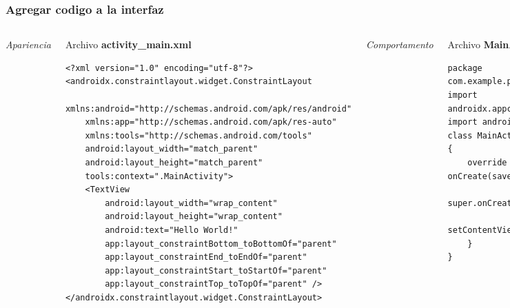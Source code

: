 \begin{frame}
\begin{columns}
\begin{center}
\end{center}
\end{columns}   
\end{frame}


\begin{frame}[fragile]
\frametitle{Agregar codigo a la interfaz}  


\begin{columns}

\textit{Apariencia}
\begin{block}{Archivo \textbf{activity\_main.xml}}
\begin{verbatim}
<?xml version="1.0" encoding="utf-8"?>
<androidx.constraintlayout.widget.ConstraintLayout 
    xmlns:android="http://schemas.android.com/apk/res/android"
    xmlns:app="http://schemas.android.com/apk/res-auto"
    xmlns:tools="http://schemas.android.com/tools"
    android:layout_width="match_parent"
    android:layout_height="match_parent"
    tools:context=".MainActivity">
    <TextView
        android:layout_width="wrap_content"
        android:layout_height="wrap_content"
        android:text="Hello World!"
        app:layout_constraintBottom_toBottomOf="parent"
        app:layout_constraintEnd_toEndOf="parent"
        app:layout_constraintStart_toStartOf="parent"
        app:layout_constraintTop_toTopOf="parent" />
</androidx.constraintlayout.widget.ConstraintLayout>
\end{verbatim}

\end{block}

\textit{Comportamento}
\begin{block}{Archivo \textbf{MainActivity.kt}}
\begin{verbatim}
package com.example.primeraplicacionandroid
import androidx.appcompat.app.AppCompatActivity
import android.os.Bundle
class MainActivity : AppCompatActivity() {
    override fun onCreate(savedInstanceState: Bundle?) {
        super.onCreate(savedInstanceState)
        setContentView(R.layout.activity_main)
    }
}
\end{verbatim}
\end{block}
\end{columns}
\end{frame}

